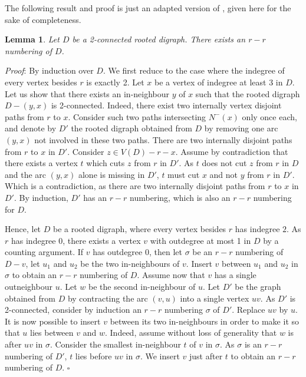 \documentclass{article}
\newtheorem{lemma}{Lemma}
\begin{document}
The following result and proof is just an adapted version of \cite{stnumdir},  given here for the sake of completeness.
 
\begin{lemma}\label{rrnum}
Let $D$ be a 2-connected rooted digraph. There exists an $r-r$ numbering of $D$.
\end{lemma}
\emph{Proof}: By induction over $D$. We first reduce to the case where the indegree of every vertex besides $r$ is exactly 2. Let $x$ be a vertex of indegree at least 3 in $D$. Let us show that there exists an in-neighbour $y$ of $x$ such that the rooted digraph $D-(y,x)$ is 2-connected.
Indeed, there exist two internally vertex disjoint paths from $r$ to $x$. Consider such two paths intersecting $N^-(x)$ only once each, and denote by $D'$ the rooted digraph obtained from $D$ by removing one arc $(y,x)$ not involved in these two paths. There are two internally disjoint paths from $r$ to $x$ in $D'$. Consider $z\in V(D)-r-x$. Assume by contradiction that there exists a vertex $t$ which cuts $z$ from $r$ in $D'$. As $t$ does not cut $z$ from $r$ in $D$ and the arc $(y,x)$ alone is missing in $D'$, $t$ must cut $x$ and not $y$ from $r$ in $D'$. Which is a contradiction, as there are two internally disjoint paths from $r$ to $x$ in $D'$. By induction, $D'$ has an $r-r$ numbering, which is also an $r-r$ numbering for $D$.

Hence, let $D$ be a rooted digraph, where every vertex besides $r$ has indegree $2$. As $r$ has indegree 0, there exists a vertex $v$ with outdegree at most 1 in $D$ by a counting argument. If $v$ has outdegree 0, then let $\sigma$ be an $r-r$ numbering of $D-v$, let $u_1$ and $u_2$ be the two in-neighbours of $v$. Insert $v$ between $u_1$ and $u_2$ in $\sigma$ to obtain an $r-r$ numbering of $D$.
Assume now that $v$ has a single outneighbour $u$. Let $w$ be the second in-neighbour of $u$. Let $D'$ be the graph obtained from $D$ by contracting the arc $(v,u)$ into a single vertex $uv$. As $D'$ is 2-connected, consider by induction an $r-r$ numbering $\sigma$ of $D'$. Replace $uv$ by $u$. It is now possible to insert $v$ between its two in-neighbours in order to make it so that $u$ lies between $v$ and $w$. Indeed, assume without loss of generality that $w$ is after $uv$ in $\sigma$. Consider the smallest in-neighbour $t$ of $v$ in $\sigma$. As $\sigma$ is an $r-r$ numbering of $D'$, $t$ lies before $uv$ in $\sigma$. We insert $v$ just after $t$ to obtain an $r-r$ numbering of $D$. $\square$
\\
\end{document}
